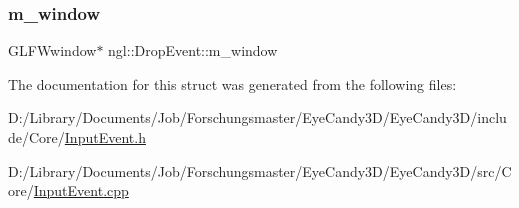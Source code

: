 \subsubsection{\texorpdfstring{m\+\_\+window}{m\_window}}
{\footnotesize\ttfamily G\+L\+F\+Wwindow$\ast$ ngl\+::\+Drop\+Event\+::m\+\_\+window}



The documentation for this struct was generated from the following files\+:\begin{DoxyCompactItemize}
\item 
D\+:/\+Library/\+Documents/\+Job/\+Forschungsmaster/\+Eye\+Candy3\+D/\+Eye\+Candy3\+D/include/\+Core/\mbox{\hyperlink{_input_event_8h}{Input\+Event.\+h}}\item 
D\+:/\+Library/\+Documents/\+Job/\+Forschungsmaster/\+Eye\+Candy3\+D/\+Eye\+Candy3\+D/src/\+Core/\mbox{\hyperlink{_input_event_8cpp}{Input\+Event.\+cpp}}\end{DoxyCompactItemize}
